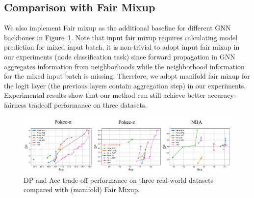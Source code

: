 \documentclass[letterpaper]{article} %
\theoremstyle{plain}
\theoremstyle{definition}
\theoremstyle{remark}
\begin{document}
\subsection{Comparison with Fair Mixup}\label{app:fairmixup}

We also implement Fair mixup \citep{chuang2021fair} as the additional baseline for different GNN backbones in Figure~\ref{fig:tradeoff_fairmixup}. Note that input fair mixup requires calculating model prediction for mixed input batch, it is non-trivial to adopt input fair mixup in our experiments (node classification task) since forward propagation in GNN  aggregates information from neighborhoods while the neighborhood information for the mixed input batch is missing. Therefore, we adopt manifold fair mixup for the logit layer (the previous layers contain aggregation step) in our experiments. Experimental results show that our method can still achieve better accuracy-fairness tradeoff performance on three datasets.

\begin{figure}[t]
\centering
\includegraphics[width=0.99\linewidth]{Tradeoff_Fmix.pdf}

\caption{DP and Acc trade-off performance on three real-world datasets compared with (manifold) Fair Mixup.}
\label{fig:tradeoff_fairmixup}
\end{figure}
\end{document}
